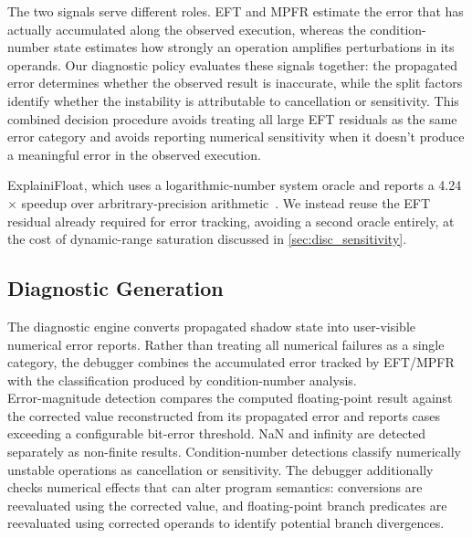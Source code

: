 The two signals serve different roles. EFT and MPFR estimate the error that has actually accumulated along the observed execution, whereas the condition-number state estimates how strongly an operation amplifies perturbations in its operands. Our diagnostic policy evaluates these signals together: the propagated error determines whether the observed result is inaccurate, while the split factors identify whether the instability is attributable to cancellation or sensitivity. This combined decision procedure avoids treating all large EFT residuals as the same error category and avoids reporting numerical sensitivity when it doesn't produce a meaningful error in the observed execution.

ExplainiFloat, which uses a logarithmic-number system oracle and reports a 4.24$\times$ speedup over arbritrary-precision arithmetic~\cite{explainifloat}. We instead reuse the EFT residual already required for error tracking, avoiding a second oracle entirely, at the cost of dynamic-range saturation discussed in \ref{sec:disc_sensitivity}.

\subsection{Diagnostic Generation}
\label{sec:diagnostic}
The diagnostic engine converts propagated shadow state into user-visible numerical error reports. Rather than treating all numerical failures as a single category, the debugger combines the accumulated error tracked by EFT/MPFR with the classification produced by condition-number analysis.\\
Error-magnitude detection compares the computed floating-point result against the corrected value reconstructed from its propagated error and reports cases exceeding a configurable bit-error threshold. NaN and infinity are detected separately as non-finite results. Condition-number detections classify numerically unstable operations as cancellation or sensitivity. The debugger additionally checks numerical effects that can alter program semantics: conversions are reevaluated using the corrected value, and floating-point branch predicates are reevaluated using corrected operands to identify potential branch divergences.



